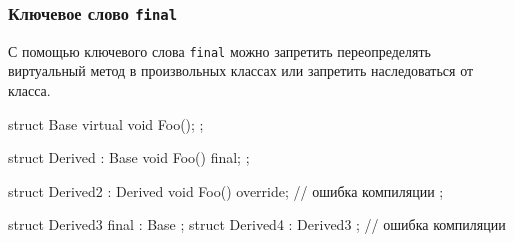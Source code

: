 \documentclass[compress, 8pt]{beamer}
\begin{document}
\begin{frame}[fragile]

    \frametitle{Ключевое слово \texttt{final}}

    \hfill\break
    С помощью ключевого слова \verb|final|\footnotemark{} можно запретить переопределять
    виртуальный метод в произвольных классах или запретить наследоваться от
    класса.


    \begin{myinplacelisting}[minted language=cpp]
struct Base {
    virtual void Foo();
};

struct Derived : Base {
    void Foo() final;
};

struct Derived2 : Derived {
    void Foo() override; // ошибка компиляции
};

struct Derived3 final : Base {};
struct Derived4 : Derived3 {}; // ошибка компиляции
    \end{myinplacelisting}

\end{frame}
\end{document}

